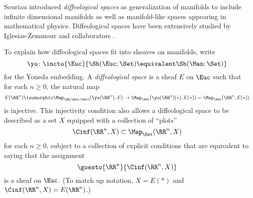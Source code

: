 \begin{remark}
	Souriau introduced \cite{MR607688} \emph{diffeological spaces} as generalization of manifolds to include infinite dimensional manifolds as well as manifold-like spaces appearing in mathematical physics.
	Diffeological spaces have been extensively studied by Iglesias-Zemmour and collaborators \cites{MR799609}{MR844156}{MR906897}{MR906897}{MR2346968}{MR2424313}{MR3025051}{MR2846342}{MR2592936}.

	To explain how diffeological spaces fit into sheaves on manifolds, write 
	\begin{equation*}
		\yo \colon \incto{\Euc}{\Sh(\Euc;\Set) \equivalent \Sh(\Man;\Set)}
	\end{equation*}
	for the Yoneda embedding.
	A \emph{diffeological space} is a sheaf $ E $ on $ \Euc $ such that for each $ n \geq 0 $, the natural map
	\begin{equation*}
		E(\RR^n) \isomorphic \Map_{\Sh(\Euc;\Set)}(\yo(\RR^n),E) \to \Map_{\Set}(\yo(\RR^n)(*),E(*)) = \Map_{\Set}(\RR^n,E(*))
	\end{equation*}
	is injective.
	This injectivity condition also allows a diffeological space to be described as a set $ X $ equipped with a
	collection of ``plots''
	\begin{equation*}
	 	\Cinf(\RR^n,X) \subset \Map_{\Set}(\RR^n,X)
	\end{equation*}
	for each $ n \geq 0 $, subject to a collection of explicit conditions that are equivalent to saying that the assignment 
	\begin{equation*}
		\goesto{\RR^n}{\Cinf(\RR^n,X)}
	\end{equation*}
	is a sheaf on $ \Euc $.
	(To match up notation, $ X = E(*) $ and $ \Cinf(\RR^n,X) = E(\RR^n) $.)
\end{remark}

